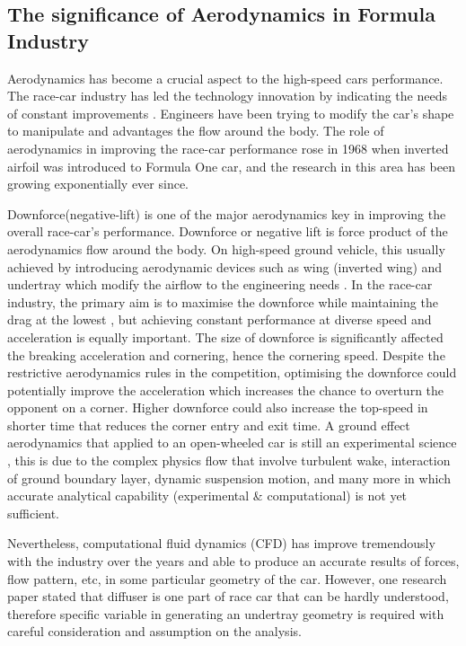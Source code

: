 \subsection{The significance of Aerodynamics in Formula Industry}
Aerodynamics has become a crucial aspect to the high-speed cars performance. The race-car industry has led the technology innovation by indicating the needs of constant improvements \cite{Zhang2006GroundCars}. Engineers have been trying to modify the car's shape to manipulate and advantages the flow around the body. The role of aerodynamics in improving the race-car performance rose in 1968 when inverted airfoil was introduced to Formula One car, and the research in this area has been growing exponentially ever since. 


Downforce(negative-lift) is one of the major aerodynamics key in improving the overall race-car's performance. Downforce or negative lift is force product of the aerodynamics flow around the body. On high-speed ground vehicle, this usually achieved by introducing aerodynamic devices such as wing (inverted wing) and undertray which modify the airflow to the engineering needs \cite{Wright1982TheCars}. In the race-car industry, the primary aim is to maximise the downforce while maintaining the drag at the lowest \cite{Zhang2006GroundCars}, but achieving constant performance at diverse speed and acceleration is equally important.  The size of downforce is significantly affected the breaking acceleration and cornering, hence the cornering speed. Despite the restrictive aerodynamics rules in the competition, optimising the downforce could potentially improve the acceleration which increases the chance to overturn the opponent on a corner. Higher downforce could also increase the top-speed in shorter time that reduces the corner entry and exit time. A ground effect aerodynamics that applied to an open-wheeled car is still an experimental science \cite{Zhang2006GroundCars}, this is due to the complex physics flow that involve turbulent wake, interaction of ground boundary layer, dynamic suspension motion, and many more in which accurate analytical capability (experimental \& computational) is not yet sufficient.

Nevertheless, computational fluid dynamics (CFD) has improve tremendously with the industry over the years and able to produce an accurate results of forces, flow pattern, etc, in some particular geometry of the car. However, one research paper \cite{Zhang2006GroundCars} stated that diffuser is one part of race car that can be hardly understood, therefore specific variable in generating an undertray geometry is required with careful consideration and assumption on the analysis. 

